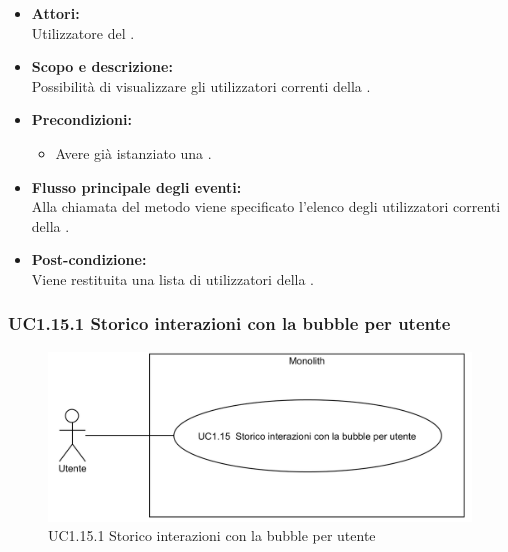 \begin{itemize}
	\item \textbf{Attori:}
	\\Utilizzatore del .
	\item \textbf{Scopo e descrizione:} 
	\\Possibilità di visualizzare gli utilizzatori correnti della .
	\item \textbf{Precondizioni:}
	\begin{itemize}
		\item Avere già istanziato una .
	\end{itemize}
	\item \textbf{Flusso principale degli eventi:}
	\\Alla chiamata del metodo viene specificato l'elenco degli utilizzatori correnti della .
	\item \textbf{Post-condizione:}
	\\Viene restituita una lista di utilizzatori della .
\end{itemize}

\subsubsection{UC1.15.1 Storico interazioni con la bubble per utente} \label{UC1.15.1}

\begin{figure}[H]
	\centering
	\includegraphics[width=15cm]{../../documenti/AnalisiDeiRequisiti/Diagrammi_img/uc1_15.png}
	\caption{UC1.15.1 Storico interazioni con la bubble per utente}
\end{figure}

